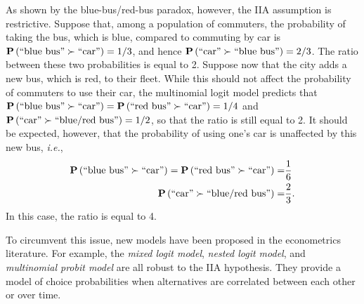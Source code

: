As shown by the blue-bus/red-bus paradox, however, the IIA assumption is restrictive.
Suppose that, among a population of commuters, the probability of taking the bus, which is blue, compared to commuting by car is $\mathbf{P}\left( \text{``blue bus''} \succ \text{``car''} \right) = 1/3$, and hence $\mathbf{P}\left( \text{``car''} \succ \text{``blue bus''} \right) = 2/3$.
The ratio between these two probabilities is equal to 2.
Suppose now that the city adds a new bus, which is red, to their fleet.
While this should not affect the probability of commuters to use their car, the multinomial logit model predicts that $\mathbf{P}\left( \text{``blue bus''} \succ \text{``car''} \right) = \mathbf{P}\left( \text{``red bus''} \succ \text{``car''} \right) = 1/4$ and $\mathbf{P}\left( \text{``car''} \succ \text{``blue/red bus''} \right) = 1/2$, so that the ratio is still equal to 2.
It should be expected, however, that the probability of using one's car is unaffected by this new bus, \textit{i.e.},
\begin{align*}
	\mathbf{P}\left( \text{``blue bus''} \succ \text{``car''} \right) =  \mathbf{P}\left( \text{``red bus''} \succ \text{``car''} \right) = & \frac{1}{6}  \\
	\mathbf{P}\left( \text{``car''} \succ \text{``blue/red bus''} \right) =                                               & \frac{2}{3}.
\end{align*}
In this case, the ratio is equal to 4.

To circumvent this issue, new models have been proposed in the econometrics literature.
For example, the \emph{mixed logit model}, \emph{nested logit model}, and \emph{multinomial probit model} are all robust to the IIA hypothesis.
They provide a model of choice probabilities when alternatives are correlated between each other or over time.


